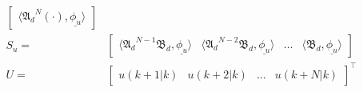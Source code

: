 \begin{equation}
\begin{aligned}
\begin{bmatrix}
            \langle {\mathfrak{A}_d}^{N} (\cdot), \underline{\phi_u} \rangle
        \end{bmatrix} \\
        S_u = &\begin{bmatrix}
            \langle {\mathfrak{A}_d}^{N-1} \mathfrak{B}_d, \underline{\phi_u} \rangle & 
            \langle {\mathfrak{A}_d}^{N-2} \mathfrak{B}_d, \underline{\phi_u} \rangle &
            \hdots &
            \langle \mathfrak{B}_d, \underline{\phi_u} \rangle
        \end{bmatrix} \\
        U = &\begin{bmatrix}
            u(k+1|k) & u(k+2|k) & \hdots & u(k+N|k)
        \end{bmatrix}^\top
    \end{aligned}
\end{equation}